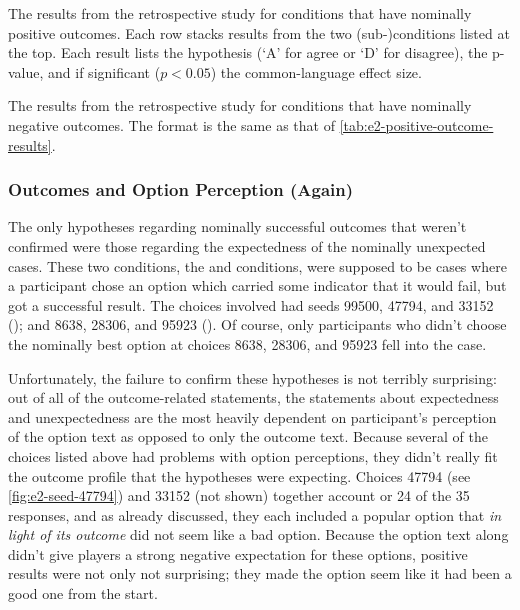 \begin{table}[!p]
\centering
\bgroup
\def\arraystretch{1.2}
\setlength{\tabcolsep}{0.4em}

\egroup
\caption[Retrospective positive outcome results]{The results from the retrospective study for conditions that have nominally positive outcomes. Each row stacks results from the two (sub-)conditions listed at the top. Each result lists the hypothesis (`A' for agree or `D' for disagree), the p-value, and if significant ($p < 0.05$) the common-language effect size.}
  \label{tab:e2-positive-outcome-results}
\end{table}

\begin{table}[!p]
\centering
\bgroup
\def\arraystretch{1.2}
\setlength{\tabcolsep}{0.4em}

\egroup
\caption[Retrospective negative outcome results]{The results from the retrospective study for conditions that have nominally negative outcomes. The format is the same as that of \cref{tab:e2-positive-outcome-results}.}
\label{tab:e2-negative-outcome-results}
\end{table}


\subsubsection{Outcomes and Option Perception (Again)}

The only hypotheses regarding nominally successful outcomes that weren't confirmed were those regarding the expectedness of the nominally unexpected cases.
%
These two conditions, the \unxs{} and \obvfa{} conditions, were supposed to be cases where a participant chose an option which carried some indicator that it would fail, but got a successful result.
%
The choices involved had seeds 99500, 47794, and 33152 (\unxs{}); and 8638, 28306, and 95923 (\obvf{}).
%
Of course, only participants who didn't choose the nominally best option at choices 8638, 28306, and 95923 fell into the \obvfa{} case.


Unfortunately, the failure to confirm these hypotheses is not terribly surprising: out of all of the outcome-related statements, the statements about expectedness and unexpectedness are the most heavily dependent on participant's perception of the option text as opposed to only the outcome text.
%
Because several of the choices listed above had problems with option perceptions, they didn't really fit the outcome profile that the hypotheses were expecting.
%
Choices 47794 (see \cref{fig:e2-seed-47794}) and 33152 (not shown) together account or 24 of the 35 \unxs{} responses, and as already discussed, they each included a popular option that \emph{in light of its outcome} did not seem like a bad option.
%
Because the option text along didn't give players a strong negative expectation for these options, positive results were not only not surprising; they made the option seem like it had been a good one from the start.


